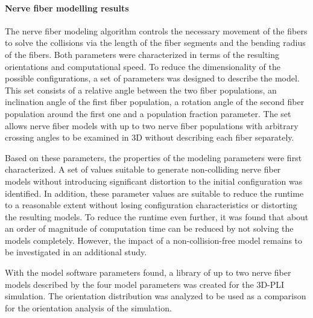\paragraph{Nerve fiber modelling results}
% 
The nerve fiber modeling algorithm controls the necessary movement of the fibers to solve the collisions via the length of the fiber segments and the bending radius of the fibers.
Both parameters were characterized in terms of the resulting orientations and computational speed.
To reduce the dimensionality of the possible configurations, a set of parameters was designed to describe the model.
This set consists of a relative angle between the two fiber populations, an inclination angle of the first fiber population, a rotation angle of the second fiber population around the first one and a population fraction parameter.
The set allows nerve fiber models with up to two nerve fiber populations with arbitrary crossing angles to be examined in 3D without describing each fiber separately.
\par
% 
Based on these parameters, the properties of the modeling parameters were first characterized.
A set of values suitable to generate non-colliding nerve fiber models without introducing significant distortion to the initial configuration was identified.
In addition, these parameter values are suitable to reduce the runtime to a reasonable extent without losing configuration characteristics or distorting the resulting models.
To reduce the runtime even further, it was found that about an order of magnitude of computation time can be reduced by not solving the models completely.
However, the impact of a non-collision-free model remains to be investigated in an additional study.
\par
% 
With the model software parameters found, a library of up to two nerve fiber models described by the four model parameters was created for the \ac{3D-PLI} simulation.
The orientation distribution was analyzed to be used as a comparison for the orientation analysis of the simulation.
% 
% 
% 
